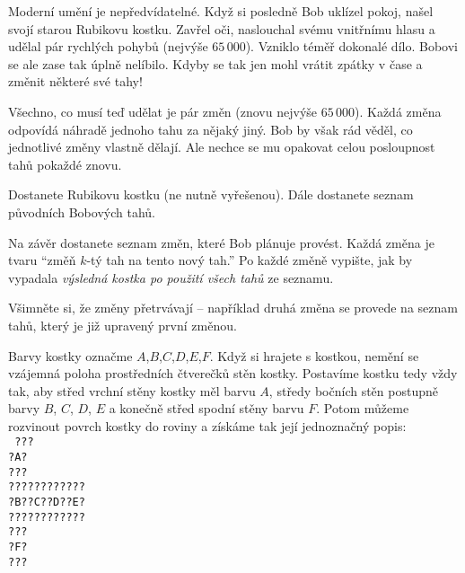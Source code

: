 





Moderní umění je nepředvídatelné.
Když si posledně Bob uklízel pokoj,
našel svojí starou Rubikovu kostku.
Zavřel oči, naslouchal svému vnitřnímu hlasu
a udělal pár rychlých pohybů (nejvýše $65\,000$).
Vzniklo téměř dokonalé dílo.
Bobovi se ale zase tak úplně nelíbilo.
Kdyby se tak jen mohl vrátit zpátky v čase a změnit některé své tahy!

Všechno, co musí teď udělat je pár změn (znovu nejvýše $65\,000$).
Každá změna odpovídá náhradě jednoho tahu za nějaký jiný.
Bob by však rád věděl, co jednotlivé změny vlastně dělají.
Ale nechce se mu opakovat celou posloupnost tahů pokaždé znovu.


Dostanete Rubikovu kostku (ne nutně vyřešenou).
Dále dostanete seznam původních Bobových tahů.

Na závěr dostanete seznam změn, které Bob plánuje provést.
Každá změna je tvaru ``změň $k$-tý tah na tento nový tah.''
Po každé změně vypište, jak by vypadala \textit{výsledná kostka
po použití všech tahů} ze seznamu.

Všimněte si, že změny přetrvávají -- například druhá změna
se provede na seznam tahů, který je již upravený první změnou.


Barvy kostky označme $A$,$B$,$C$,$D$,$E$,$F$.
Když si hrajete s kostkou, nemění
se vzájemná poloha prostředních čtverečků stěn kostky.
Postavíme kostku tedy vždy tak, aby střed vrchní stěny
kostky měl barvu $A$, středy bočních stěn postupně barvy $B$, $C$, $D$, $E$
a konečně střed spodní stěny barvu $F$.
Potom můžeme rozvinout povrch kostky do roviny a získáme
tak její jednoznačný popis:\\
\texttt{
???\\
?A?\\
???\\
????????????\\
?B??C??D??E?\\
????????????\\
???\\
?F?\\
???\\
}

